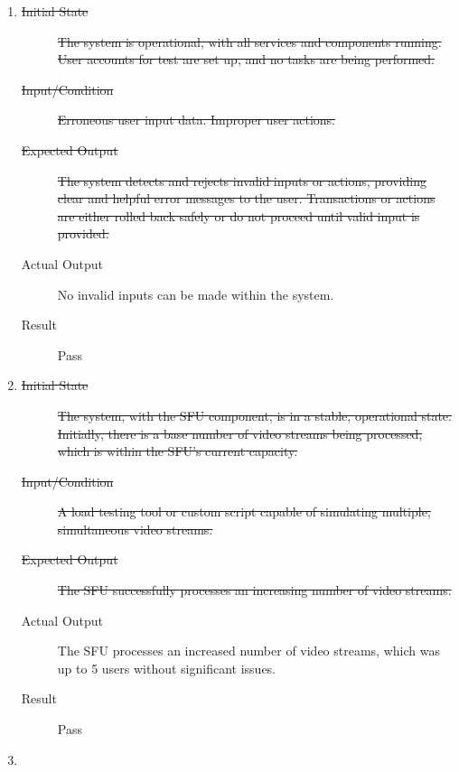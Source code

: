 \documentclass[12pt, titlepage]{article}
\begin{document}
\begin{enumerate}[NFR-T1]
  \item \label{NFRT4}
    \begin{description}
    \item[\sout{Initial State}]\sout{ The system is operational, with all services and
      components running. User accounts for test are set up, and no tasks are
      being performed.
    }
		\item[\sout{Input/Condition}]\sout{ Erroneous user input data. Improper user actions.
    }
		\item[\sout{Expected Output}]\sout{ The system detects and rejects invalid inputs or
      actions, providing clear and helpful error messages to the user.
      Transactions or actions are either rolled back safely or do not proceed
      until valid input is provided.
    }
		\item[Actual Output] No invalid inputs can be made within the system.
    \item[Result] Pass
    \end{description}
  \item \label{NFRT6}
    \begin{description}
    \item[\sout{Initial State}]\sout{ The system, with the SFU component, is in a stable,
      operational state. Initially, there is a base number of video streams
      being processed, which is within the SFU's current capacity.
    }
		\item[\sout{Input/Condition}]\sout{ A load testing tool or custom script capable of
      simulating multiple, simultaneous video streams.
    }
		\item[\sout{Expected Output}]\sout{ The SFU successfully processes an increasing number of
      video streams.
    }
		\item[Actual Output] The SFU processes an increased number of video streams,
      which was up to 5 users without significant issues.
    \item[Result] Pass
    \end{description}
  \item \label{NFRT7}

\end{enumerate}
\end{document}
